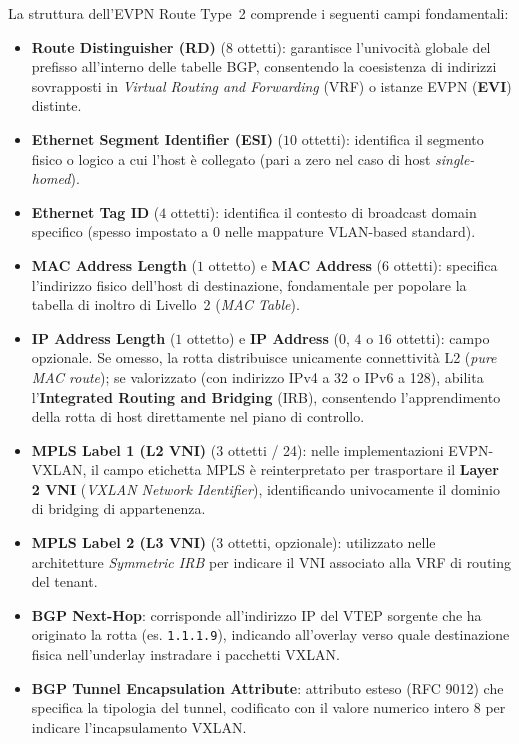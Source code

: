 \documentclass[11pt, a4paper]{article}
\begin{document}
La struttura dell'EVPN Route Type~2 comprende i seguenti campi fondamentali:
\begin{itemize}
    \item \textbf{Route Distinguisher (RD)} ($8$ ottetti): garantisce l'univocità globale del prefisso all'interno delle tabelle BGP, consentendo la coesistenza di indirizzi sovrapposti in \emph{Virtual Routing and Forwarding} (VRF) o istanze EVPN (\textbf{EVI}) distinte.
    \item \textbf{Ethernet Segment Identifier (ESI)} ($10$ ottetti): identifica il segmento fisico o logico a cui l'host è collegato (pari a zero nel caso di host \emph{single-homed}).
    \item \textbf{Ethernet Tag ID} ($4$ ottetti): identifica il contesto di broadcast domain specifico (spesso impostato a \num{0} nelle mappature VLAN-based standard).
    \item \textbf{MAC Address Length} ($1$ ottetto) e \textbf{MAC Address} ($6$ ottetti): specifica l'indirizzo fisico dell'host di destinazione, fondamentale per popolare la tabella di inoltro di Livello~2 (\emph{MAC Table}).
    \item \textbf{IP Address Length} ($1$ ottetto) e \textbf{IP Address} ($0$, $4$ o $16$ ottetti): campo opzionale. Se omesso, la rotta distribuisce unicamente connettività L2 (\emph{pure MAC route}); se valorizzato (con indirizzo IPv4 a \SI{32}{\bit} o IPv6 a \SI{128}{\bit}), abilita l'\textbf{Integrated Routing and Bridging} (IRB), consentendo l'apprendimento della rotta di host direttamente nel piano di controllo.
    \item \textbf{MPLS Label 1 (L2 VNI)} ($3$ ottetti / \SI{24}{\bit}): nelle implementazioni EVPN-VXLAN, il campo etichetta MPLS è reinterpretato per trasportare il \textbf{Layer 2 VNI} (\emph{VXLAN Network Identifier}), identificando univocamente il dominio di bridging di appartenenza.
    \item \textbf{MPLS Label 2 (L3 VNI)} ($3$ ottetti, opzionale): utilizzato nelle architetture \emph{Symmetric IRB} per indicare il VNI associato alla VRF di routing del tenant.
    \item \textbf{BGP Next-Hop}: corrisponde all'indirizzo IP del VTEP sorgente che ha originato la rotta (es. \texttt{1.1.1.9}), indicando all'overlay verso quale destinazione fisica nell'underlay instradare i pacchetti VXLAN.
    \item \textbf{BGP Tunnel Encapsulation Attribute}: attributo esteso (RFC 9012) che specifica la tipologia del tunnel, codificato con il valore numerico intero $8$ per indicare l'incapsulamento VXLAN.
\end{itemize}
\end{document}

